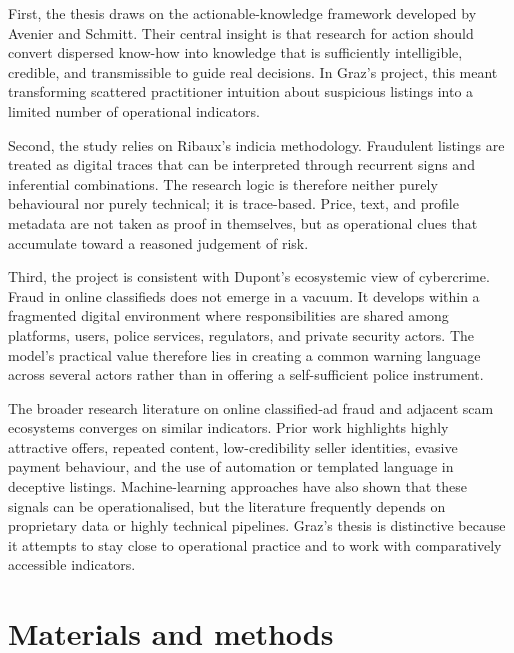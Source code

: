 \documentclass[11pt,a4paper]{article}
\begin{document}
First, the thesis draws on the actionable-knowledge framework developed by Avenier and Schmitt. Their central insight is that research for action should convert dispersed know-how into knowledge that is sufficiently intelligible, credible, and transmissible to guide real decisions. In Graz's project, this meant transforming scattered practitioner intuition about suspicious listings into a limited number of operational indicators.

Second, the study relies on Ribaux's indicia methodology. Fraudulent listings are treated as digital traces that can be interpreted through recurrent signs and inferential combinations. The research logic is therefore neither purely behavioural nor purely technical; it is trace-based. Price, text, and profile metadata are not taken as proof in themselves, but as operational clues that accumulate toward a reasoned judgement of risk.

Third, the project is consistent with Dupont's ecosystemic view of cybercrime. Fraud in online classifieds does not emerge in a vacuum. It develops within a fragmented digital environment where responsibilities are shared among platforms, users, police services, regulators, and private security actors. The model's practical value therefore lies in creating a common warning language across several actors rather than in offering a self-sufficient police instrument.

The broader research literature on online classified-ad fraud and adjacent scam ecosystems converges on similar indicators. Prior work highlights highly attractive offers, repeated content, low-credibility seller identities, evasive payment behaviour, and the use of automation or templated language in deceptive listings. Machine-learning approaches have also shown that these signals can be operationalised, but the literature frequently depends on proprietary data or highly technical pipelines. Graz's thesis is distinctive because it attempts to stay close to operational practice and to work with comparatively accessible indicators.

\section{Materials and methods}
\end{document}
